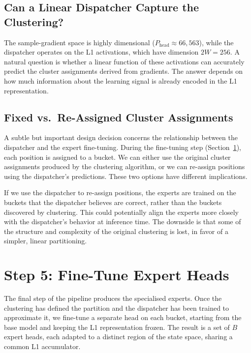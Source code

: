 \subsection{Can a Linear Dispatcher Capture the Clustering?}\label{sec:disp-expressiveness}

The sample-gradient space is highly dimensional (\(P_{\mathrm{head}} \approx 66{,}563\)), while the dispatcher operates on the L1 activations, which have dimension \(2W = 256\). A natural question is whether a linear function of these activations can accurately predict the cluster assignments derived from gradients. The answer depends on how much information about the learning signal is already encoded in the L1 representation.

\subsection{Fixed vs.\ Re-Assigned Cluster Assignments}\label{sec:disp-reassign}

A subtle but important design decision concerns the relationship between the dispatcher and the expert fine-tuning. During the fine-tuning step (Section~\ref{sec:step-experts}), each position is assigned to a bucket. We can either use the original cluster assignments produced by the clustering algorithm, or we can re-assign positions using the dispatcher's predictions. These two options have different implications.

If we use the dispatcher to re-assign positions, the experts are trained on the buckets that the dispatcher believes are correct, rather than the buckets discovered by clustering. This could potentially align the experts more closely with the dispatcher's behavior at inference time. The downside is that some of the structure and complexity of the original clustering is lost, in favor of a simpler, linear partitioning.

\section{Step 5: Fine-Tune Expert Heads}\label{sec:step-experts}

The final step of the pipeline produces the specialised experts. Once the clustering has defined the partition and the dispatcher has been trained to approximate it, we fine-tune a separate head on each bucket, starting from the base model and keeping the L1 representation frozen. The result is a set of \(B\) expert heads, each adapted to a distinct region of the state space, sharing a common L1 accumulator.

